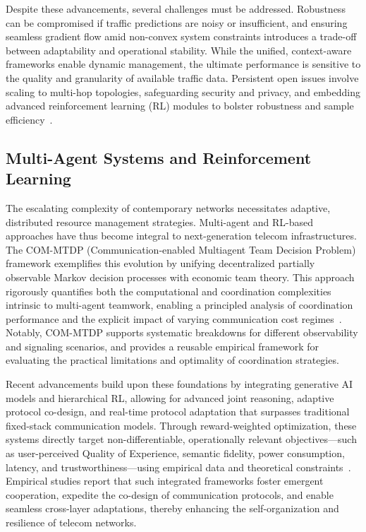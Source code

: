 \documentclass[sigconf]{acmart}
\begin{document}
Despite these advancements, several challenges must be addressed. Robustness can be compromised if traffic predictions are noisy or insufficient, and ensuring seamless gradient flow amid non-convex system constraints introduces a trade-off between adaptability and operational stability. While the unified, context-aware frameworks enable dynamic management, the ultimate performance is sensitive to the quality and granularity of available traffic data. Persistent open issues involve scaling to multi-hop topologies, safeguarding security and privacy, and embedding advanced reinforcement learning (RL) modules to bolster robustness and sample efficiency~\cite{ref48}.

\subsection{Multi-Agent Systems and Reinforcement Learning}

The escalating complexity of contemporary networks necessitates adaptive, distributed resource management strategies. Multi-agent and RL-based approaches have thus become integral to next-generation telecom infrastructures. The COM-MTDP (Communication-enabled Multiagent Team Decision Problem) framework exemplifies this evolution by unifying decentralized partially observable Markov decision processes with economic team theory. This approach rigorously quantifies both the computational and coordination complexities intrinsic to multi-agent teamwork, enabling a principled analysis of coordination performance and the explicit impact of varying communication cost regimes~\cite{ref32}. Notably, COM-MTDP supports systematic breakdowns for different observability and signaling scenarios, and provides a reusable empirical framework for evaluating the practical limitations and optimality of coordination strategies.

Recent advancements build upon these foundations by integrating generative AI models and hierarchical RL, allowing for advanced joint reasoning, adaptive protocol co-design, and real-time protocol adaptation that surpasses traditional fixed-stack communication models. Through reward-weighted optimization, these systems directly target non-differentiable, operationally relevant objectives---such as user-perceived Quality of Experience, semantic fidelity, power consumption, latency, and trustworthiness---using empirical data and theoretical constraints~\cite{ref1,ref26,ref36}. Empirical studies report that such integrated frameworks foster emergent cooperation, expedite the co-design of communication protocols, and enable seamless cross-layer adaptations, thereby enhancing the self-organization and resilience of telecom networks.
\end{document}
